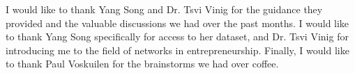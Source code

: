 I would like to thank Yang Song and Dr. Tsvi Vinig for the guidance they provided and the valuable discussions we had over the past months. I would like to thank Yang Song specifically for access to her dataset, and Dr. Tsvi Vinig for introducing me to the field of networks in entrepreneurship. Finally, I would like to thank Paul Voskuilen for the brainstorms we had over coffee.
